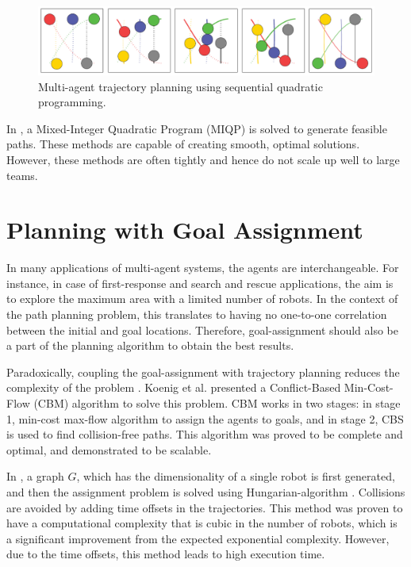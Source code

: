 \begin{figure}
\centering
\includegraphics[width=\textwidth]{./images/dandrea_scp.png}
\caption[Multi-agent trajectory planning using sequential quadratic programming.]{Multi-agent trajectory planning using sequential quadratic programming. \cite{augugliaro2012generation}}
\label{fig:sqp}
\end{figure}

In \cite{mellinger2012mixed}, a Mixed-Integer Quadratic Program (MIQP) is solved to generate feasible paths. These methods are capable of creating smooth, optimal solutions. However, these methods are often tightly and hence do not scale  up well to large teams. 

\section{Planning with Goal Assignment}
In many applications of multi-agent systems, the agents are interchangeable. For instance, in case of first-response and search and rescue applications, the aim is to explore the maximum area with a limited number of robots. In the context of the path planning problem, this translates to having no one-to-one correlation between the initial and goal locations. Therefore, goal-assignment should also be a part of the planning algorithm to obtain the best results. 

Paradoxically, coupling the goal-assignment with trajectory planning reduces the complexity of the problem \cite{turpin2013trajectory}. Koenig et al. \cite{ma2016optimal} presented a Conflict-Based Min-Cost-Flow (CBM) algorithm to solve this problem. CBM works in two stages: in stage 1, min-cost max-flow algorithm \cite{goldberg1987solving} to assign the agents to goals, and in stage 2, CBS is used to find collision-free paths. This algorithm was proved to be complete and optimal, and demonstrated to be scalable. 

In \cite{turpin2014goal}, a graph $G$, which has the dimensionality of a single robot is first generated, and then the assignment problem is solved using Hungarian-algorithm \cite{kuhn1955hungarian}. Collisions are avoided by adding time offsets in the trajectories. This method was proven to have a computational complexity that is cubic in the number of robots, which is a significant improvement from the expected exponential complexity. However, due to the time offsets, this method leads to high execution time.
